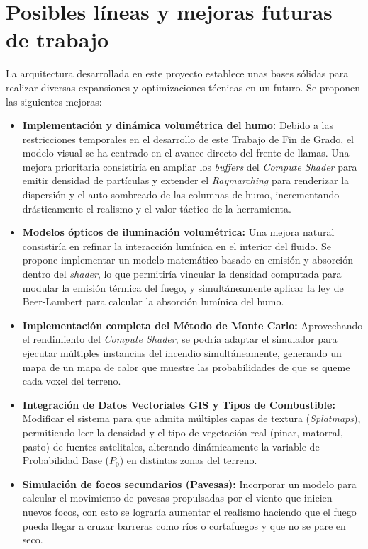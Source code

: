 \section{Posibles líneas y mejoras futuras de trabajo}
La arquitectura desarrollada en este proyecto establece unas bases sólidas para realizar  diversas expansiones y optimizaciones técnicas en un futuro. Se proponen las siguientes mejoras:

\begin{itemize}
    \item \textbf{Implementación y dinámica volumétrica del humo:} Debido a las restricciones temporales en el desarrollo de este Trabajo de Fin de Grado, el modelo visual se ha centrado en el avance directo del frente de llamas. Una mejora prioritaria consistiría en ampliar los \textit{buffers} del \textit{Compute Shader} para emitir densidad de partículas y extender el \textit{Raymarching} para renderizar la dispersión y el auto-sombreado de las columnas de humo, incrementando drásticamente el realismo y el valor táctico de la herramienta.

    \item \textbf{Modelos ópticos de iluminación volumétrica:} Una mejora natural consistiría en refinar la interacción lumínica en el interior del fluido. Se propone implementar un modelo matemático basado en emisión y absorción dentro del \textit{shader}, lo que permitiría vincular la densidad computada para modular la emisión térmica del fuego, y simultáneamente aplicar la ley de Beer-Lambert para calcular la absorción lumínica del humo. 
   
    \item \textbf{Implementación completa del Método de Monte Carlo:} Aprovechando el rendimiento del \textit{Compute Shader}, se podría adaptar el simulador para ejecutar múltiples instancias del incendio simultáneamente, generando un mapa de un mapa de calor que muestre las probabilidades de que se queme cada voxel del terreno.
    
    \item \textbf{Integración de Datos Vectoriales GIS y Tipos de Combustible:} Modificar el sistema para que admita múltiples capas de textura (\textit{Splatmaps}), permitiendo leer la densidad y el tipo de vegetación real (pinar, matorral, pasto) de fuentes satelitales, alterando dinámicamente la variable de Probabilidad Base ($P_0$) en distintas zonas del terreno.
    
    \item \textbf{Simulación de focos secundarios (Pavesas):} Incorporar un modelo para calcular el movimiento de pavesas propulsadas por el viento que inicien nuevos focos, con esto se lograría aumentar el realismo haciendo que el fuego pueda llegar a cruzar barreras como ríos o cortafuegos y que no se pare en seco.
    
    
\end{itemize}


